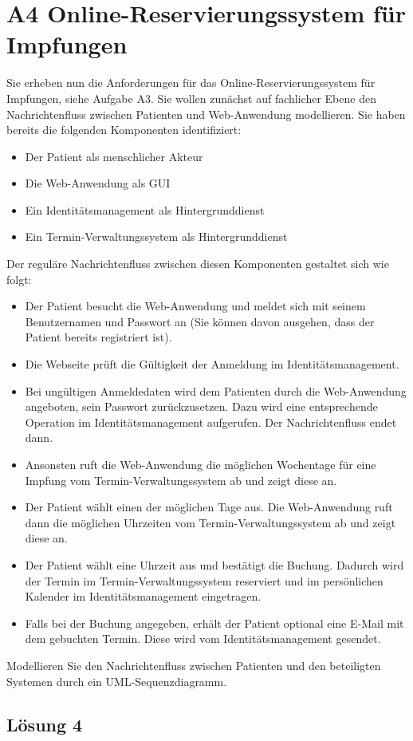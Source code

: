 \documentclass[main.tex]{subfiles}
\begin{document}
\section{A4 Online-Reservierungssystem für Impfungen}
Sie erheben nun die Anforderungen für das Online-Reservierungssystem für Impfungen, siehe
Aufgabe A3. Sie wollen zunächst auf fachlicher Ebene den Nachrichtenfluss zwischen Patienten
und Web-Anwendung modellieren. Sie haben bereits die folgenden Komponenten identifiziert:

\begin{itemize}
    \item Der Patient als menschlicher Akteur
    \item Die Web-Anwendung als GUI
    \item Ein Identitätsmanagement als Hintergrunddienst
    \item Ein Termin-Verwaltungssystem als Hintergrunddienst
\end{itemize}
Der reguläre Nachrichtenfluss zwischen diesen Komponenten gestaltet sich wie folgt:


\begin{itemize}
    \item Der Patient besucht die Web-Anwendung und meldet sich mit seinem Benutzernamen und Passwort an (Sie können davon ausgehen, dass der Patient bereits registriert ist).
    \item Die Webseite prüft die Gültigkeit der Anmeldung im Identitätsmanagement.
    \item Bei ungültigen Anmeldedaten wird dem Patienten durch die Web-Anwendung angeboten, sein Passwort zurückzusetzen. Dazu wird eine entsprechende Operation im Identitätsmanagement aufgerufen. Der Nachrichtenfluss endet dann.
    \item Ansonsten ruft die Web-Anwendung die möglichen Wochentage für eine Impfung vom Termin-Verwaltungssystem ab und zeigt diese an.
    \item Der Patient wählt einen der möglichen Tage aus. Die Web-Anwendung ruft dann die möglichen Uhrzeiten vom Termin-Verwaltungssystem ab und zeigt diese an.
    \item Der Patient wählt eine Uhrzeit aus und bestätigt die Buchung. Dadurch wird der Termin im Termin-Verwaltungssystem reserviert und im persönlichen Kalender im Identitätsmanagement eingetragen.
    \item Falls bei der Buchung angegeben, erhält der Patient optional eine E-Mail mit dem gebuchten Termin. Diese wird vom Identitätsmanagement gesendet.
\end{itemize}

Modellieren Sie den Nachrichtenfluss zwischen Patienten und den beteiligten Systemen durch ein
UML-Sequenzdiagramm.

\subsection{Lösung 4}
\end{document}

